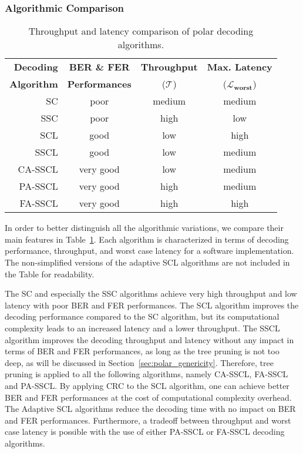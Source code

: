 \subsubsection{Algorithmic Comparison}

\begin{table}[htp]
  \centering
  \caption{Throughput and latency comparison of polar decoding algorithms.}
  \label{tab:polar_algos}
   \begin{tabular}{r c c c}
    \textbf{Decoding}  & \textbf{BER \& FER}   & \multirow{1}{*}{\textbf{Throughput}} & \textbf{Max. Latency}        \\
    \textbf{Algorithm} & \textbf{Performances} & ($\bm{\mathcal{T}}$)                 & ($\bm{\mathcal{L}_{worst}}$) \\
    \hline
    \hline
    SC      & poor      & medium & medium \\
    SSC     & poor      & high   & low    \\
    SCL     & good      & low    & high   \\
    SSCL    & good      & low    & medium \\
    CA-SSCL & very good & low    & medium \\
    PA-SSCL & very good & high   & medium \\
    FA-SSCL & very good & high   & high   \\
  \end{tabular}
\end{table}

In order to better distinguish all the algorithmic variations, we compare their
main features in Table~\ref{tab:polar_algos}. Each algorithm is characterized in
terms of decoding performance, throughput, and worst case latency for a software
implementation. The non-simplified versions of the adaptive SCL algorithms are
not included in the Table for readability.

The SC and especially the SSC algorithms achieve very high throughput and low
latency with poor BER and FER performances. The SCL algorithm improves the
decoding performance compared to the SC algorithm, but its computational
complexity leads to an increased latency and a lower throughput. The SSCL
algorithm improves the decoding throughput and latency without any impact in
terms of BER and FER performances, as long as the tree pruning is not too deep,
as will be discussed in Section~\ref{sec:polar_genericity}. Therefore, tree
pruning is applied to all the following algorithms, namely CA-SSCL, FA-SSCL and
PA-SSCL. By applying CRC to the SCL algorithm, one can achieve better BER and
FER performances at the cost of computational complexity overhead. The Adaptive
SCL algorithms reduce the decoding time with no impact on BER and FER
performances. Furthermore, a tradeoff between throughput and worst case latency
is possible with the use of either PA-SSCL or FA-SSCL decoding algorithms.

